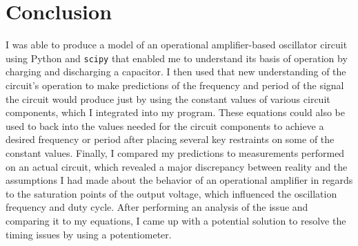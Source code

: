 \documentclass[12pt]{article}
\begin{document}
\section{Conclusion}
I was able to produce a model of an operational amplifier-based oscillator circuit using Python and \texttt{scipy} that enabled me to understand its basis of operation by charging and discharging a capacitor. I then used that new understanding of the circuit's operation to make predictions of the frequency and period of the signal the circuit would produce just by using the constant values of various circuit components, which I integrated into my program. These equations could also be used to back into the values needed for the circuit components to achieve a desired frequency or period after placing several key restraints on some of the constant values. Finally, I compared my predictions to measurements performed on an actual circuit, which revealed a major discrepancy between reality and the assumptions I had made about the behavior of an operational amplifier in regards to the saturation points of the output voltage, which influenced the oscillation frequency and duty cycle. After performing an analysis of the issue and comparing it to my equations, I came up with a potential solution to resolve the timing issues by using a potentiometer.



\clearpage
\end{document}
